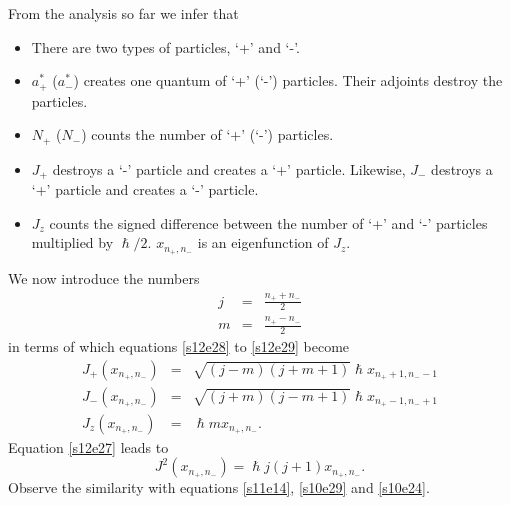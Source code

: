 \documentclass{article}
\numberwithin{equation}{section}
\theoremstyle{plain}
\numberwithin{thm}{section}
\theoremstyle{plain}
\numberwithin{prop}{section}
\theoremstyle{definition}
\numberwithin{defn}{section}
\theoremstyle{remark}
\begin{document}
From the analysis so far we infer that
\begin{itemize}
\item There are two types of particles, `+' and `-'.
\item $a_+^\ast$ ($a_-^\ast$) creates one quantum of `+' (`-') particles. Their
adjoints destroy the particles.
\item $N_+$ ($N_-$) counts the number of `+' (`-') particles.
\item $J_+$ destroys a `-' particle and creates a `+' particle. Likewise, $J_-$
destroys a `+' particle and creates a `-' particle.  
\item $J_z$ counts the signed difference between the number of `+' and `-' 
particles multiplied by $\hslash/2$. $x_{n_+,n_-}$ is an eigenfunction of $J_z$.
\end{itemize}
We now introduce the numbers
\begin{eqnarray}
j &=& \frac{n_+ + n_-}{2} \label{s12e31} \\
m &=& \frac{n_+ - n_-}{2} \label{s12e32}
\end{eqnarray}
in terms of which equations \eqref{s12e28} to \eqref{s12e29} become
\begin{eqnarray}
J_+(x_{n_+,n_-}) &=& \sqrt{(j-m)(j+m+1)}\hslash
x_{n_+ + 1, n_- - 1} \label{s12e33} \\
J_-(x_{n_+,n_-}) &=& \sqrt{(j+m)(j-m+1)}\hslash
x_{n_+ - 1, n_- + 1} \label{s12e34} \\
J_z(x_{n_+,n_-}) &=& \hslash m x_{n_+, n_-}. \label{s12e35}
\end{eqnarray}
Equation \eqref{s12e27} leads to
\begin{equation}\label{s12e36}
J^2(x_{n_+,n_-}) = \hslash j(j+1)x_{n_+,n_-}.
\end{equation}
Observe the similarity with equations \eqref{s11e14}, \eqref{s10e29} and
\eqref{s10e24}.


\end{document}

